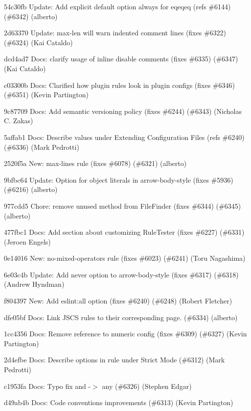 \begin{DoxyItemize}
\item 54c30fb Update\+: Add explicit default option {\ttfamily always} for {\ttfamily eqeqeq} (refs \#6144) (\#6342) (alberto)
\item 2d63370 Update\+: max-\/len will warn indented comment lines (fixes \#6322) (\#6324) (Kai Cataldo)
\item dcd4ad7 Docs\+: clarify usage of inline disable comments (fixes \#6335) (\#6347) (Kai Cataldo)
\item c03300b Docs\+: Clarified how plugin rules look in plugin configs (fixes \#6346) (\#6351) (Kevin Partington)
\item 9c87709 Docs\+: Add semantic versioning policy (fixes \#6244) (\#6343) (Nicholas C. Zakas)
\item 5affab1 Docs\+: Describe values under Extending Configuration Files (refs \#6240) (\#6336) (Mark Pedrotti)
\item 2520f5a New\+: {\ttfamily max-\/lines} rule (fixes \#6078) (\#6321) (alberto)
\item 9bfbc64 Update\+: Option for object literals in {\ttfamily arrow-\/body-\/style} (fixes \#5936) (\#6216) (alberto)
\item 977cdd5 Chore\+: remove unused method from File\+Finder (fixes \#6344) (\#6345) (alberto)
\item 477fbc1 Docs\+: Add section about customizing Rule\+Tester (fixes \#6227) (\#6331) (Jeroen Engels)
\item 0e14016 New\+: {\ttfamily no-\/mixed-\/operators} rule (fixes \#6023) (\#6241) (Toru Nagashima)
\item 6e03c4b Update\+: Add never option to arrow-\/body-\/style (fixes \#6317) (\#6318) (Andrew Hyndman)
\item f804397 New\+: Add {\ttfamily eslint\+:all} option (fixes \#6240) (\#6248) (Robert Fletcher)
\item dfe05bf Docs\+: Link J\+S\+CS rules to their corresponding page. (\#6334) (alberto)
\item 1cc4356 Docs\+: Remove reference to numeric config (fixes \#6309) (\#6327) (Kevin Partington)
\item 2d4efbe Docs\+: Describe options in rule under Strict Mode (\#6312) (Mark Pedrotti)
\item c1953fa Docs\+: Typo fix \textquotesingle{}and\textquotesingle{} -\/$>$ \textquotesingle{}any\textquotesingle{} (\#6326) (Stephen Edgar)
\item d49ab4b Docs\+: Code conventions improvements (\#6313) (Kevin Partington)

\end{DoxyItemize}
